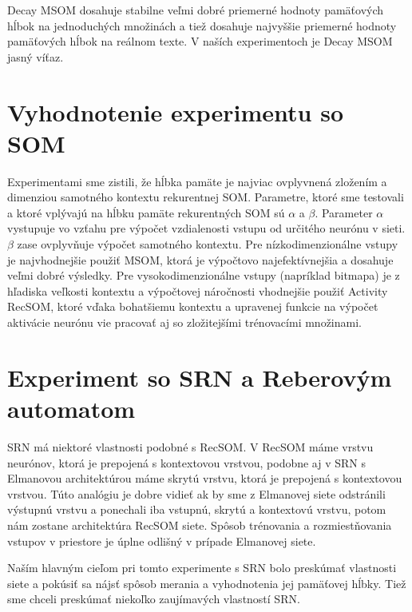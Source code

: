 Decay MSOM dosahuje stabilne veľmi dobré priemerné hodnoty pamäťových hĺbok na jednoduchých množinách a 
tiež dosahuje najvyššie priemerné hodnoty pamäťových hĺbok na reálnom texte.
V naších experimentoch je Decay MSOM jasný víťaz.

\section{ Vyhodnotenie experimentu so SOM}
Experimentami sme zistili, že hĺbka pamäte je najviac ovplyvnená zložením a dimenziou samotného kontextu rekurentnej SOM.
Parametre, ktoré sme testovali a ktoré vplývajú na hĺbku pamäte rekurentných SOM sú $\alpha$ a $\beta$.
Parameter $\alpha$ vystupuje vo vzťahu pre výpočet vzdialenosti vstupu od určitého neurónu v sieti.
$\beta$ zase ovplyvňuje výpočet samotného kontextu.
Pre nízkodimenzionálne vstupy je najvhodnejšie použiť MSOM, ktorá je výpočtovo najefektívnejšia a dosahuje veľmi dobré 
výsledky.
Pre vysokodimenzionálne vstupy (napríklad bitmapa) je z hľadiska veľkosti kontextu a výpočtovej náročnosti vhodnejšie použiť
Activity RecSOM, ktoré vďaka bohatšiemu kontextu a upravenej funkcie na výpočet aktivácie neurónu vie pracovať aj so zložitejšími trénovacími množinami.


\section{Experiment so SRN a Reberovým automatom}
SRN má niektoré vlastnosti podobné s RecSOM.
V RecSOM máme vrstvu neurónov, ktorá je prepojená s kontextovou vrstvou, podobne 
aj v SRN s Elmanovou architektúrou máme skrytú vrstvu, ktorá je prepojená s kontextovou vrstvou.
Túto analógiu je dobre vidieť ak by sme z Elmanovej siete odstránili výstupnú vrstvu a ponechali iba 
vstupnú, skrytú a kontextovú vrstvu, potom nám zostane architektúra RecSOM siete.
Spôsob trénovania a rozmiestňovania vstupov v priestore je úplne odlišný v prípade Elmanovej siete.

Naším hlavným cieľom pri tomto experimente s SRN bolo preskúmať vlastnosti siete a pokúsiť sa nájsť 
spôsob merania a vyhodnotenia jej pamäťovej hĺbky. 
Tiež sme chceli preskúmať niekoľko zaujímavých vlastností SRN.

